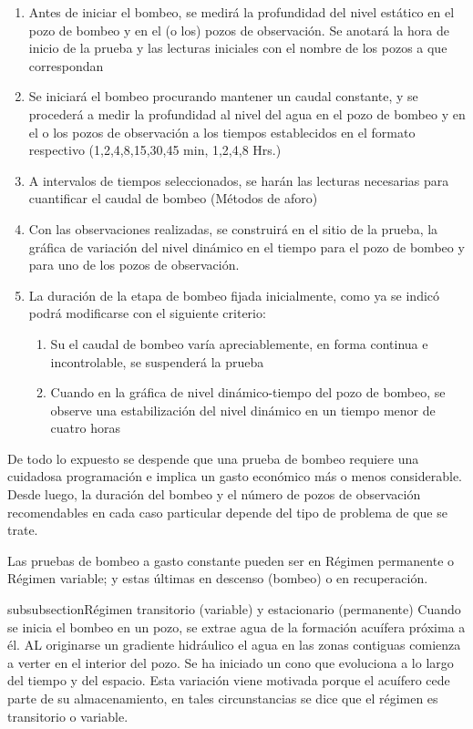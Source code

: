 \begin{enumerate}
    \item Antes de iniciar el bombeo, se medirá la profundidad del nivel estático en el pozo de bombeo y en el (o los) pozos de observación. Se anotará la hora de inicio de la prueba y las lecturas iniciales con el nombre de los pozos a que correspondan
    \item Se iniciará el bombeo procurando mantener un caudal constante, y se procederá a medir la profundidad al nivel del agua en el pozo de bombeo y en el o los pozos de observación a los tiempos establecidos en el formato respectivo (1,2,4,8,15,30,45 min, 1,2,4,8 Hrs.)
    \item A intervalos de tiempos seleccionados, se harán las lecturas necesarias para cuantificar el caudal de bombeo (Métodos de aforo)
    \item Con las observaciones realizadas, se construirá en el sitio de la prueba, la gráfica de variación del nivel dinámico en el tiempo para el pozo de bombeo y para uno de los pozos de observación.
    \item La duración de la etapa de bombeo fijada inicialmente, como ya se indicó podrá modificarse con el siguiente criterio: \begin{enumerate}
    \item Su el caudal de bombeo varía apreciablemente, en forma continua e incontrolable, se suspenderá la prueba
    \item Cuando en la gráfica de nivel dinámico-tiempo del pozo de bombeo, se observe una estabilización del nivel dinámico en un tiempo menor de cuatro horas
    \end{enumerate}
\end{enumerate}
De todo lo expuesto se despende que una prueba de bombeo requiere una cuidadosa programación e implica un gasto económico más o menos considerable. Desde luego, la duración del bombeo y el número de pozos de observación recomendables en cada caso particular depende del tipo de problema de que se trate.

Las pruebas de bombeo a gasto constante pueden ser en Régimen permanente o Régimen variable; y estas últimas en descenso (bombeo) o en recuperación.

subsubsection{Régimen transitorio (variable) y estacionario (permanente)}
Cuando se inicia el bombeo en un pozo, se extrae agua de la formación acuífera próxima a él. AL originarse un gradiente hidráulico el agua en las zonas contiguas comienza a verter en el interior del pozo. Se ha iniciado un cono que evoluciona a lo largo del tiempo y del espacio. Esta variación viene motivada porque el acuífero cede parte de su almacenamiento, en tales circunstancias se dice que el régimen es transitorio o variable.

